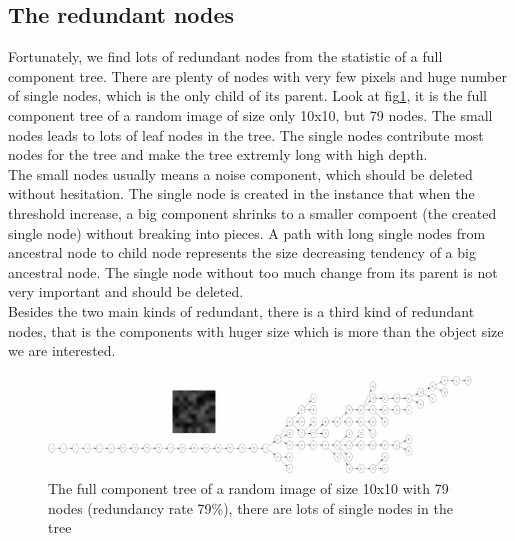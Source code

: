 \subsection{The redundant nodes}
Fortunately, we find lots of redundant nodes from the statistic of a full component tree. There are plenty of nodes with very few pixels and huge number of single nodes, which is the only child of its parent. Look at fig\ref{fig:cptree-random}, it is the full component tree of a random image of size only 10x10, but 79 nodes. The small nodes leads to lots of leaf nodes in the tree. The single nodes contribute most nodes for the tree and make the tree extremly long with high depth. \\
The small nodes usually means a noise component, which should be deleted without hesitation. The single node is created in the instance that when the threshold increase, a big component shrinks to a smaller compoent (the created single node) without breaking into pieces. A path with long single nodes from ancestral node to child node represents the size decreasing tendency of a big ancestral node. The single node without too much change from its parent is not very important and should be deleted.\\
Besides the two main kinds of redundant, there is a third kind of redundant nodes, that is the components with huger size which is more than the object size we are interested. 
\begin{figure}[htbp]
\centering
\includegraphics[width=1.0\textwidth]{images/cptree_random}
\caption[The full component tree of a random image]{The full component tree of a random image of size 10x10 with 79 nodes (redundancy rate 79\%), there are lots of single nodes in the tree}
\label{fig:cptree-random}
\end{figure}

